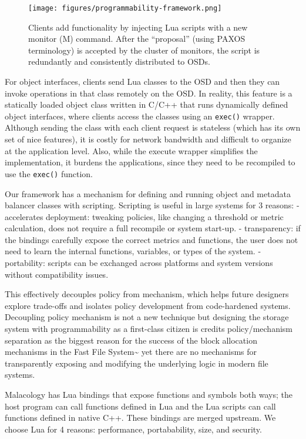 \documentclass[10pt,twocolumn]{article}
\begin{document}
\begin{figure}[htbp]
\centering
\texttt{[image: figures/programmability-framework.png]}
\caption{Clients add functionality by injecting Lua scripts with a new
monitor (M) command. After the ``proposal'' (using PAXOS terminology) is
accepted by the cluster of monitors, the script is redundantly and
consistently distributed to OSDs. \label{fig:programmability-framework}}
\end{figure}

For object interfaces, clients send Lua classes to the OSD and then they
can invoke operations in that class remotely on the OSD. In reality,
this feature is a statically loaded object class written in C/C++ that
runs dynamically defined object interfaces, where clients access the
classes using an \texttt{exec()} wrapper. Although sending the class
with each client request is stateless (which has its own set of nice
features), it is costly for network bandwidth and difficult to organize
at the application level. Also, while the execute wrapper simplifies the
implementation, it burdens the applications, since they need to be
recompiled to use the \texttt{exec()} function.

Our framework has a mechanism for defining and running object and
metadata balancer classes with scripting. Scripting is useful in large
systems for 3 reasons: - accelerates deployment: tweaking policies, like
changing a threshold or metric calculation, does not require a full
recompile or system start-up. - transparency: if the bindings carefully
expose the correct metrics and functions, the user does not need to
learn the internal functions, variables, or types of the system. -
portability: scripts can be exchanged across platforms and system
versions without compatibility issues.

This effectively decouples policy from mechanism, which helps future
designers explore trade-offs and isolates policy development from
code-hardened systems. Decoupling policy mechanism is not a new
technique but designing the storage system with programmability as a
first-class citizen is credits policy/mechanism separation as the
biggest reason for the success of the block allocation mechanisms in the
Fast File System\textasciitilde{}\cite{mckusick:fast2015-FFS} yet there
are no mechanisms for transparently exposing and modifying the
underlying logic in modern file systems.

Malacology has Lua bindings that expose functions and symbols both ways;
the host program can call functions defined in Lua and the Lua scripts
can call functions defined in native C++. These bindings are merged
upstream. We choose Lua for 4 reasons: performance, portabability, size,
and security.
\end{document}
